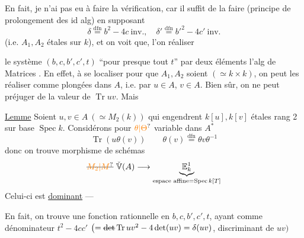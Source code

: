 En fait, je n'ai pas eu à faire la vérification, car  il suffit de la faire (principe de prolongement des id alg)  en supposant
\[ \delta\overset{\text{dfn}}{=}b^2-4c\ \text{inv.},\quad \delta'\overset{\text{dfn}}{=}b'^2-4c'\ \text{inv.} \]
(i.e. $A_1,A_2$ étales sur $k$), et on  voit que,  l'on  réaliser 

le système $(b,c,b',c',t)$ ``pour presque tout  $t$''  par deux éléments   l'alg de Matrices . En effet,   à se localiser pour que $A_1,A_2$ soient  $(\simeq k\times k)$, on peut les réaliser comme plongées dans $A$, i.e. par $u\in A$, $v\in A$.
Bien sûr, on ne  peut préjuger de la valeur de $\operatorname{Tr}uv$. Mais 

\uline{Lemme} Soient $u,v\in A\ (\simeq M_2(k))$ qui  engendrent $k[u],k[v]$ étales rang 2 sur base $\operatorname{Spec}k$. Considérons pour $\unsure{\theta|\Theta}$ variable dans $A^*$
\[ \operatorname{Tr}(u\theta(v)) \qquad \theta(v)\overset{\text{dfn}}{=}\theta v\theta^{-1} \]
donc on trouve morphisme de schémas
\[ \deleted{\unsure{M_2|M}}\ \check{\mathbb V}(A)\longrightarrow\underbrace{\mathbb E^1_k}_{\text{espace affine}=\operatorname{Spec}k[T]} \]
Celui-ci est \uline{dominant} --- 

En fait, on trouve une fonction rationnelle en $b,c,b',c',t$, ayant comme dénominateur $t^2-4cc'$ $\bigl(=\deleted{\det}\operatorname{Tr}uv^2-4\det(uv)=\delta(uv)$, discriminant de $uv\bigr)$

